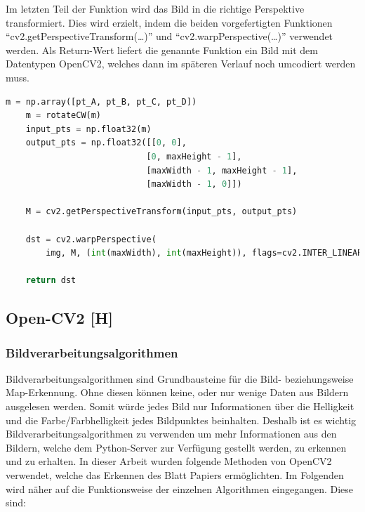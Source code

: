 Im letzten Teil der Funktion wird das Bild in die richtige Perspektive transformiert. Dies wird erzielt, indem die beiden vorgefertigten Funktionen ``cv2.getPerspectiveTransform(\dots)'' und ``cv2.warpPerspective(\dots)'' verwendet werden. Als Return-Wert liefert die genannte Funktion ein Bild mit dem Datentypen OpenCV2, welches dann im späteren Verlauf noch umcodiert werden muss.

\begin{lstlisting}[language=Python,label=lst:impl:wrapPerspective,firstnumber=40]
    m = np.array([pt_A, pt_B, pt_C, pt_D])
    m = rotateCW(m)
    input_pts = np.float32(m)
    output_pts = np.float32([[0, 0],
                            [0, maxHeight - 1],
                            [maxWidth - 1, maxHeight - 1],
                            [maxWidth - 1, 0]])

    M = cv2.getPerspectiveTransform(input_pts, output_pts)

    dst = cv2.warpPerspective(
        img, M, (int(maxWidth), int(maxHeight)), flags=cv2.INTER_LINEAR)

    return dst
\end{lstlisting}


\subsection{Open-CV2 [H]}
\subsubsection{Bildverarbeitungsalgorithmen} \label{maai:alogs}

Bildverarbeitungsalgorithmen sind Grundbausteine für die Bild- beziehungsweise Map-Erkennung. Ohne diesen können keine, oder nur wenige Daten aus Bildern ausgelesen werden. Somit würde jedes Bild nur Informationen über die Helligkeit und die Farbe/Farbhelligkeit jedes Bildpunktes beinhalten. Deshalb ist es wichtig Bildverarbeitungsalgorithmen zu verwenden um mehr Informationen aus den Bildern, welche dem Python-Server zur Verfügung gestellt werden, zu erkennen und zu erhalten. In dieser Arbeit wurden folgende Methoden von OpenCV2 verwendet, welche das Erkennen des Blatt Papiers ermöglichten. Im Folgenden wird näher auf die Funktionsweise der einzelnen Algorithmen eingegangen. Diese sind:


